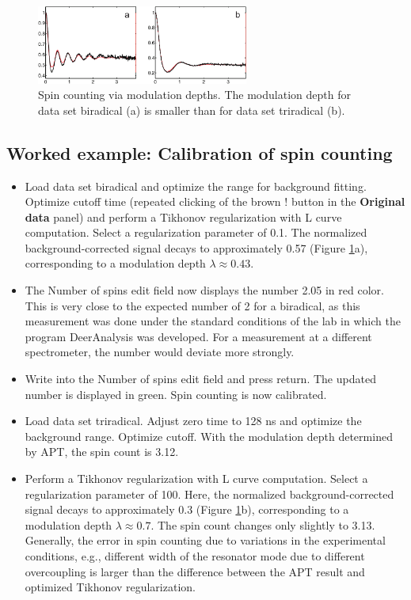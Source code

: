 \documentclass[11pt,a4paper]{article}
\begin{document}
\begin{figure}[ht]
 \vspace{10mm}
 	\begin{center}
		\includegraphics[width=0.62\textwidth]{figure12.pdf}
	\end{center}
	\caption{Spin counting via modulation depths. The modulation depth for data set {\ttfamily biradical} (a) is smaller than for data set {\ttfamily triradical} (b).}
	\label{fig:12}
\end{figure}

\subsection{Worked example: Calibration of spin counting}

\begin{itemize}
	\item Load data set {\ttfamily biradical} and optimize the range for background fitting. Optimize cutoff time (repeated clicking of the brown {\ttfamily !} button in the {\ttfamily \bf Original data} panel) and perform a Tikhonov regularization with L curve computation. Select a regularization parameter of 0.1. The normalized background-corrected signal decays to approximately 0.57 (Figure \ref{fig:12}a), corresponding to a modulation depth $\lambda \approx 0.43$.
	\item The {\ttfamily Number of spins} edit field now displays the number 2.05 in red color. This is very close to the expected number of 2 for a biradical, as this measurement was done under the standard conditions of the lab in which the program DeerAnalysis was developed. For a measurement at a different spectrometer, the number would deviate more strongly. 
	\item Write {} into the {\ttfamily Number of spins} edit field and press return. The updated number is displayed in green. Spin counting is now calibrated.
	\item Load data set {\ttfamily triradical}. Adjust zero time to 128 ns and optimize the background range. Optimize cutoff. With the modulation depth determined by APT, the spin count is 3.12. 
	\item Perform a Tikhonov regularization with L curve computation. Select a regularization parameter of 100. Here, the normalized background-corrected signal decays to approximately 0.3 (Figure \ref{fig:12}b), corresponding to a modulation depth $\lambda \approx 0.7$. The spin count changes only slightly to 3.13. Generally, the error in spin counting due to variations in the experimental conditions, e.g., different width of the resonator mode due to different overcoupling is larger than the difference between the APT result and optimized Tikhonov regularization. 
\end{itemize}
\end{document}

